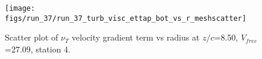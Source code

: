 \begin{figure}[H]
\centering
\texttt{[image: figs/run\_37/run\_37\_turb\_visc\_ettap\_bot\_vs\_r\_meshscatter]}
\caption{Scatter plot of $\nu_T$ velocity gradient term vs radius at $z/c$=8.50, $V_{free}$=27.09, station 4.}
\label{fig:run_37_turb_visc_ettap_bot_vs_r_meshscatter}
\end{figure}


